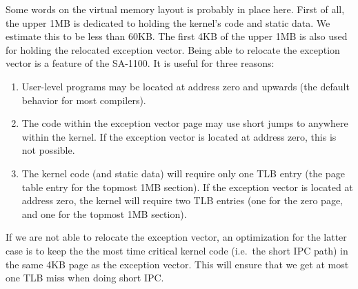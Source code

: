 \documentclass[a4paper,10pt,twoside]{article}
\begin{document}

Some words on the virtual memory layout is probably in place here.
First of all, the upper 1MB is dedicated to holding the kernel's code
and static data.  We estimate this to be less than 60KB.  The first
4KB of the upper 1MB is also used for holding the relocated exception
vector.  Being able to relocate the exception vector is a feature of
the SA-1100.  It is useful for three reasons:

\begin{enumerate}
\item User-level programs may be located at address zero and upwards
  (the default behavior for most compilers).
\item The code within the exception vector page may use short jumps to 
  anywhere within the kernel.  If the exception vector is located at
  address zero, this is not possible.
\item The kernel code (and static data) will require only one TLB
  entry (the page table entry for the topmost 1MB section).  If the
  exception vector is located at address zero, the kernel will require
  two TLB entries (one for the zero page, and one for the topmost 1MB
  section).
\end{enumerate}

If we are not able to relocate the exception vector, an optimization
for the latter case is to keep the the most time critical kernel code
(i.e.\ the short IPC path) in the same 4KB page as the exception
vector.  This will ensure that we get at most one TLB miss when doing
short IPC.
\end{document}

